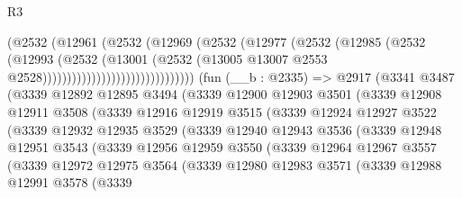 \begin{lexlean}{R3}
\begin{coremodule}
                                      (@2532
                                        (@12961
                                          (@2532
                                            (@12969
                                              (@2532
                                                (@12977
                                                  (@2532
                                                    (@12985
                                                      (@2532
                                                        (@12993
                                                          (@2532
                                                            (@13001
                                                              (@2532
                                                                (@13005
                                                                  @13007
                                                                  @2553
                                                                  @2528)))))))))))))))))))))))))))))))
    (fun (__b : @2335) =>
    @2917
      (@3341
        @3487
        (@3339
          @12892
          @12895
          @3494
          (@3339
            @12900
            @12903
            @3501
            (@3339
              @12908
              @12911
              @3508
              (@3339
                @12916
                @12919
                @3515
                (@3339
                  @12924
                  @12927
                  @3522
                  (@3339
                    @12932
                    @12935
                    @3529
                    (@3339
                      @12940
                      @12943
                      @3536
                      (@3339
                        @12948
                        @12951
                        @3543
                        (@3339
                          @12956
                          @12959
                          @3550
                          (@3339
                            @12964
                            @12967
                            @3557
                            (@3339
                              @12972
                              @12975
                              @3564
                              (@3339
                                @12980
                                @12983
                                @3571
                                (@3339
                                  @12988
                                  @12991
                                  @3578
                                  (@3339

\end{coremodule}
\end{lexlean}
